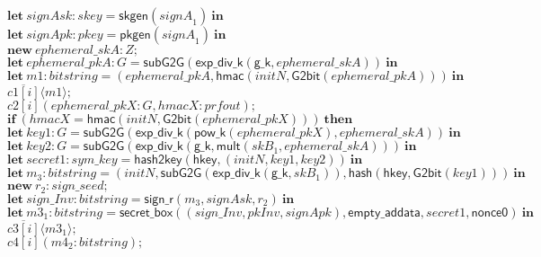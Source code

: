 \documentclass{article}
\newcommand{\cinput}[2]{{#1}({#2})}
\newcommand{\coutput}[2]{\overline{#1}\langle{#2}\rangle}
\newcommand{\kw}[1]{\mathbf{#1}}
\newcommand{\kwf}[1]{\mathsf{#1}}
\newcommand{\var}[1]{\mathit{#1}}
\newcommand{\kwt}[1]{\mathit{#1}}
\newcommand{\kwc}[1]{\mathit{#1}}
\begin{document}
\begin{tabbing}
\>$\quad \kw{let}\ \var{signAsk}: \kwt{skey} = \kwf{skgen}(\var{signA}_{1})\ \kw{in}$\\
\>$\quad \kw{let}\ \var{signApk}: \kwt{pkey} = \kwf{pkgen}(\var{signA}_{1})\ \kw{in}$\\
\>$\quad \kw{new}\ \var{ephemeral{\_}skA}: \kwt{Z};$\\
\>$\quad \kw{let}\ \var{ephemeral{\_}pkA}: \kwt{G} = \kwf{subG2G}(\kwf{exp{\_}div{\_}k}(\kwf{g{\_}k}, \var{ephemeral{\_}skA}))\ \kw{in}$\\
\>$\quad \kw{let}\ \var{m1}: \kwt{bitstring} = \kwf{}(\var{ephemeral{\_}pkA}, \kwf{hmac}(\var{initN}, \kwf{G2bit}(\var{ephemeral{\_}pkA})))\ \kw{in}$\\
\>$\quad \coutput{\kwc{c1}[\var{i}]}{\var{m1}};$\\
\>$\quad \cinput{\kwc{c2}[\var{i}]}{\var{ephemeral{\_}pkX}: \kwt{G}, \var{hmacX}: \kwt{prfout}};$\\
\>$\quad \kw{if}\ (\var{hmacX}  =  \kwf{hmac}(\var{initN}, \kwf{G2bit}(\var{ephemeral{\_}pkX})))\ \kw{then}$\\
\>$\quad \kw{let}\ \var{key1}: \kwt{G} = \kwf{subG2G}(\kwf{exp{\_}div{\_}k}(\kwf{pow{\_}k}(\var{ephemeral{\_}pkX}), \var{ephemeral{\_}skA}))\ \kw{in}$\\
\>$\quad \kw{let}\ \var{key2}: \kwt{G} = \kwf{subG2G}(\kwf{exp{\_}div{\_}k}(\kwf{g{\_}k}, \kwf{mult}(\var{skB}_{1}, \var{ephemeral{\_}skA})))\ \kw{in}$\\
\>$\quad \kw{let}\ \var{secret1}: \kwt{sym{\_}key} = \kwf{hash2key}(\kwf{hkey}, \kwf{}(\var{initN}, \var{key1}, \var{key2}))\ \kw{in}$\\
\>$\quad \kw{let}\ \var{m}_{3}: \kwt{bitstring} = \kwf{}(\var{initN}, \kwf{subG2G}(\kwf{exp{\_}div{\_}k}(\kwf{g{\_}k}, \var{skB}_{1})), \kwf{hash}(\kwf{hkey}, \kwf{G2bit}(\var{key1})))\ \kw{in}$\\
\>$\quad \kw{new}\ \var{r}_{2}: \kwt{sign{\_}seed};$\\
\>$\quad \kw{let}\ \var{sign{\_}Inv}: \kwt{bitstring} = \kwf{sign{\_}r}(\var{m}_{3}, \var{signAsk}, \var{r}_{2})\ \kw{in}$\\
\>$\quad \kw{let}\ \var{m3}_{1}: \kwt{bitstring} = \kwf{secret{\_}box}(\kwf{}(\var{sign{\_}Inv}, \var{pkInv}, \var{signApk}), \kwf{empty{\_}addata}, \var{secret1}, \kwf{nonce0})\ \kw{in}$\\
\>$\quad \coutput{\kwc{c3}[\var{i}]}{\var{m3}_{1}};$\\
\>$\quad \cinput{\kwc{c4}[\var{i}]}{\var{m4}_{2}: \kwt{bitstring}};$\\

\end{tabbing}
\end{document}

